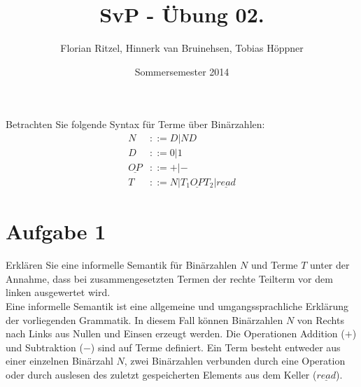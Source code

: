 \documentclass[ngerman,a4paper]{report}
\author{Florian Ritzel, Hinnerk van Bruinehsen, Tobias Höppner}
\title{SvP - Übung 02. }
\date{Sommersemester 2014}
\renewcommand{\maketitle}{}
\begin{document}
\maketitle
Betrachten Sie folgende Syntax für Terme über Binärzahlen:
\begin{align*}
N &::= D | ND \\
D &::= 0 | 1 \\
\underline{OP} &::= + | - \\
T &::= N | T_1 \underline{OP}  T_2 | \underline{read}
\end{align*}
\section*{Aufgabe 1}
Erklären Sie eine informelle Semantik für Binärzahlen $N$ und Terme $T$ unter der Annahme, dass bei zusammengesetzten Termen der rechte Teilterm vor dem linken ausgewertet wird.\\
Eine informelle Semantik ist eine allgemeine und umgangssprachliche Erklärung der vorliegenden Grammatik. In diesem Fall können Binärzahlen $N$ von Rechts nach Links aus Nullen und Einsen erzeugt werden. Die Operationen Addition ($+$) und Subtraktion ($-$) sind auf Terme definiert. Ein Term besteht entweder aus einer einzelnen Binärzahl $N$, zwei Binärzahlen verbunden durch eine Operation oder durch auslesen des zuletzt gespeicherten Elements aus dem Keller ($\underline{read}$).\\
\end{document}
